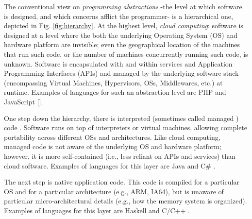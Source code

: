 The conventional view on \textit{programming abstractions} -the level at which software is designed, and which concerns afflict the programmer- is a hierarchical one, depicted in Fig. \ref{fig:hierarchy}. At the highest level, \textit{cloud computing}: software is designed at a level where the both the underlying Operating System (OS) and hardware platform are invisible; even the geographical location of the machines that run such code, or the number of machines concurrently running such code, is unknown. Software is encapsulated with and within services \cite{} and Application Programming Interfaces (APIs) \cite{} and managed by the underlying software stack (encompassing Virtual Machines, Hypervisors, OSs, Middlewares, etc.) at runtime. Examples of languages for such an abstraction level are PHP \cite{} and JavaScript \ref{}.
\par One step down the hierarchy, there is interpreted (sometimes called managed \cite{}) code \cite{}. Software runs on top of interpreters or virtual machines, allowing complete portability across different OSs and architectures. Like cloud computing, managed code is not aware of the underlying OS and hardware platform; however, it is more self-contained (i.e., less reliant on APIs and services) than cloud software. Examples of languages for this layer are Java \cite{} and C\# \cite{}.
\par The next step is native application code. This code is compiled for a particular OS and for a particular architecture (e.g., ARM, IA64), but is unaware of particular micro-architectural details (e.g., how the memory system is organized). Examples of languages for this layer are Haskell \cite{} and C/C++ \cite{}.



























